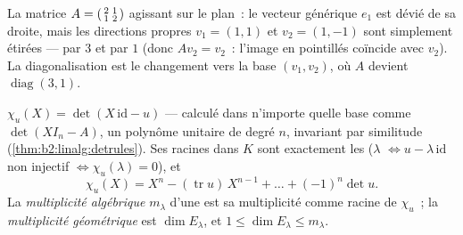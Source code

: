 \begin{omfigure}

{\small La matrice $A = \begin{psmallmatrix}2 & 1\\ 1 &
2\end{psmallmatrix}$ agissant sur le plan~: le vecteur générique
$e_1$ est dévié de sa droite, mais les directions propres $v_1 =
(1,1)$ et $v_2 = (1,-1)$ sont simplement étirées --- par $3$ et par
$1$ (donc $Av_2 = v_2$~: l'image en pointillés coïncide avec $v_2$).
La diagonalisation est le changement vers la base $(v_1, v_2)$, où
$A$ devient $\operatorname{diag}(3, 1)$.}
\end{omfigure}

\begin{definition}\label{def:b2:reduction:charpoly}
$\chi_u(X) = \det(X\,\mathrm{id} - u)$ --- calculé dans n'importe quelle base comme
$\det(XI_n - A)$, un polynôme unitaire de degré $n$, invariant par
similitude (\cref{thm:b2:linalg:detrules}). Ses racines dans $K$ sont
exactement les  ($\lambda$  $\iff u -
\lambda\,\mathrm{id}$ non injectif $\iff \chi_u(\lambda) = 0$), et
\[
\chi_u(X) = X^n - (\operatorname{tr} u)\, X^{n-1} + \dots +
(-1)^n \det u .
\]
La \emph{multiplicité algébrique}
$m_\lambda$ d'une  est sa multiplicité comme racine de
$\chi_u$~; la \emph{multiplicité géométrique} est $\dim E_\lambda$, et $1 \leq \dim E_\lambda \leq
m_\lambda$.
\end{definition}

